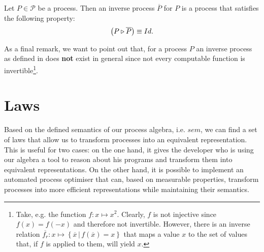 \begin{definition}
\label{def:inverse_process}
Let $P \in \mathcal{P}$ be a process. Then an inverse process $\overline{P}$ for $P$ is a process that satisfies the following property:
  \begin{equation}
    \left( P \triangleright \overline{P} \right) \equiv Id.
  \end{equation}
  \hfill\qedsymbol
\end{definition}



As a final remark, we want to point out that, for a process $P$ an inverse process as defined in  does \textbf{not} exist in general since not every computable function is invertible\footnote{Take, e.g. the function $f \colon x \mapsto x^2$. Clearly, $f$ is not injective since $f \left( x \right) = f \left( -x \right)$ and therefore not invertible. However, there is an inverse relation $\overline{f_r} \colon x \mapsto \left\{ \overline{x} \,|\, f \left( \overline{x} \right) = x \right\}$ that maps a value $x$ to the set of values that, if $f$ is applied to them, will yield $x$.}.






\section{Laws}
\label{chp:laws}
Based on the defined semantics of our process algebra, i.e. $sem$, we can find a set of laws that allow us to transform processes into an equivalent representation. This is useful for two cases: on the one hand, it gives the developer who is using our algebra a tool to reason about his programs and transform them into equivalent representations. On the other hand, it is possible to implement an automated process optimiser that can, based on measurable properties, transform processes into more efficient representations while maintaining their semantics.


